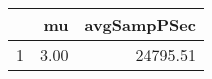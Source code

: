 \begin{table}[h]
\centering
\begin{tabular}{rrr}
  \hline
 & mu & avgSampPSec \\ 
  \hline
1 & 3.00 & 24795.51 \\ 
   \hline
\end{tabular}
\end{table}
